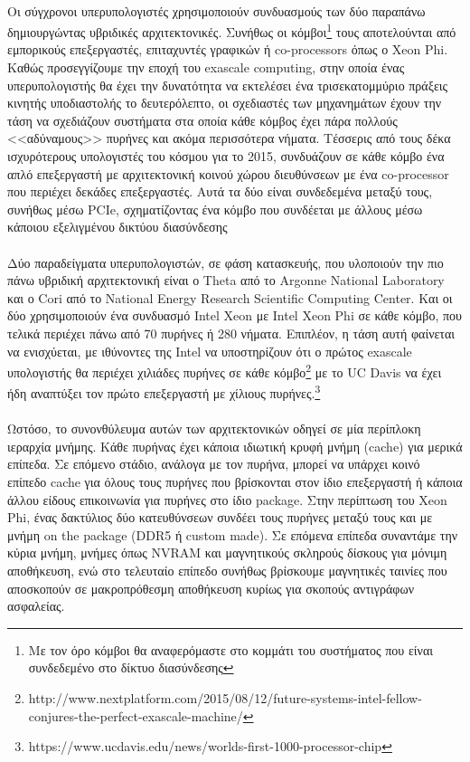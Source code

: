 \paragraph{}
Οι σύγχρονοι υπερυπολογιστές χρησιμοποιούν συνδυασμούς των δύο παραπάνω δημιουργώντας υβριδικές αρχιτεκτονικές. Συνήθως οι κόμβοι\footnote{Με τον όρο κόμβοι θα αναφερόμαστε στο κομμάτι του συστήματος που είναι συνδεδεμένο στο δίκτυο διασύνδεσης} τους αποτελούνται από εμπορικούς επεξεργαστές, επιταχυντές γραφικών ή co-processors όπως ο Xeon Phi. Καθώς προσεγγίζουμε την εποχή του exascale computing, στην οποία ένας υπερυπολογιστής θα έχει την δυνατότητα να εκτελέσει ένα τρισεκατομμύριο πράξεις κινητής υποδιαστολής το δευτερόλεπτο, οι σχεδιαστές των μηχανημάτων έχουν την τάση να σχεδιάζουν συστήματα στα οποία  κάθε κόμβος έχει πάρα πολλούς <<αδύναμους>> πυρήνες και ακόμα περισσότερα νήματα. Τέσσερις από τους δέκα ισχυρότερους υπολογιστές του κόσμου για το 2015, συνδυάζουν σε κάθε κόμβο ένα απλό επεξεργαστή με αρχιτεκτονική κοινού χώρου διευθύνσεων με ένα co-processor που περιέχει δεκάδες επεξεργαστές. Αυτά τα δύο είναι συνδεδεμένα μεταξύ τους, συνήθως μέσω PCIe, σχηματίζοντας ένα κόμβο που συνδέεται με άλλους μέσω κάποιου εξελιγμένου δικτύου διασύνδεσης 

\paragraph{}
Δύο παραδείγματα υπερυπολογιστών, σε φάση κατασκευής, που υλοποιούν την πιο πάνω υβριδική αρχιτεκτονική είναι ο Theta από το Argonne National Laboratory και ο Cori από το National Energy Research Scientific Computing Center. Και οι δύο χρησιμοποιούν ένα συνδυασμό Intel Xeon με Intel Xeon Phi σε κάθε κόμβο, που τελικά περιέχει πάνω από 70 πυρήνες ή 280 νήματα. Επιπλέον, η τάση αυτή φαίνεται να ενισχύεται, με ιθύνοντες της Intel να υποστηρίζουν ότι ο πρώτος exascale υπολογιστής θα περιέχει χιλιάδες πυρήνες σε κάθε κόμβο\footnote{http://www.nextplatform.com/2015/08/12/future-systems-intel-fellow-conjures-the-perfect-exascale-machine/} με το UC Davis να έχει ήδη αναπτύξει τον πρώτο επεξεργαστή με χίλιους πυρήνες.\footnote{https://www.ucdavis.edu/news/worlds-first-1000-processor-chip}

\paragraph{}
Ωστόσο, το συνονθύλευμα αυτών των αρχιτεκτονικών οδηγεί σε μία περίπλοκη ιεραρχία μνήμης. Κάθε πυρήνας έχει κάποια ιδιωτική  κρυφή μνήμη (cache) για μερικά επίπεδα. Σε επόμενο στάδιο, ανάλογα με τον πυρήνα, μπορεί να υπάρχει κοινό επίπεδο cache για όλους τους πυρήνες που βρίσκονται στον ίδιο επεξεργαστή ή κάποια άλλου είδους επικοινωνία για πυρήνες στο ίδιο package. Στην περίπτωση του Xeon Phi, ένας δακτύλιος δύο κατευθύνσεων συνδέει τους πυρήνες μεταξύ τους και με μνήμη on the package (DDR5 ή custom made). Σε επόμενα επίπεδα συναντάμε την κύρια μνήμη, μνήμες όπως NVRAM και μαγνητικούς σκληρούς δίσκους για μόνιμη αποθήκευση, ενώ στο τελευταίο επίπεδο συνήθως βρίσκουμε μαγνητικές ταινίες που αποσκοπούν σε μακροπρόθεσμη αποθήκευση κυρίως για σκοπούς αντιγράφων ασφαλείας. 

